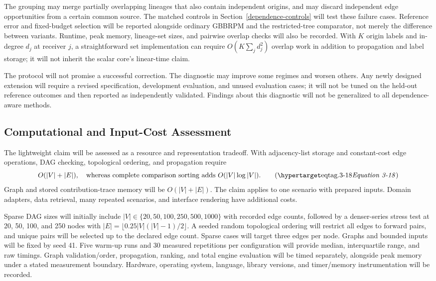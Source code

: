 The grouping may merge partially overlapping lineages that also contain
independent origins, and may discard independent edge opportunities from a
certain common source. The matched controls in Section~\ref{dependence-controls}
will test these failure cases. Reference error and fixed-budget selection will
be reported alongside ordinary GBBRPM and the restricted-tree comparator,
not merely the difference between
variants. Runtime, peak memory, lineage-set sizes, and pairwise overlap checks
will also be recorded. With $K$ origin labels and in-degree $d_j$
at receiver $j$, a straightforward set implementation can require
$O(K\sum_j d_j^2)$ overlap work in addition to propagation and label storage;
it will not inherit the scalar core's linear-time claim.

The protocol will not promise a successful correction. The diagnostic may
improve some regimes and worsen others. Any newly designed extension will
require a revised specification, development evaluation, and unused evaluation
cases; it will not be tuned on the held-out reference outcomes and then
reported as independently validated. Findings about this diagnostic will not
be generalized to all dependence-aware methods.

\subsection{Computational and Input-Cost Assessment}
\label{computational-scalability}

The lightweight claim will be assessed as a resource and representation
tradeoff. With adjacency-list storage and constant-cost edge operations,
DAG checking, topological ordering, and propagation require
\[
O(|V|+|E|),
\quad\text{whereas complete comparison sorting adds }O(|V|\log|V|).
\eqtag{3-18}
\]
Graph and stored contribution-trace memory will be $O(|V|+|E|)$.
The claim applies to one scenario with prepared inputs. Domain adapters,
data retrieval, many repeated scenarios, and interface rendering have
additional costs.

Sparse DAG sizes will initially include
$|V|\in\{20,50,100,250,500,1000\}$ with recorded edge counts, followed
by a denser-series stress test at 20, 50, 100, and 250 nodes with
$|E|=\lfloor0.25|V|(|V|-1)/2\rfloor$. A seeded random topological
ordering will restrict all edges to forward pairs, and unique pairs
will be selected up to the declared edge count. Sparse cases will target
three edges per node. Graphs and bounded inputs will be fixed by seed
41. Five warm-up runs and 30 measured repetitions per
configuration will provide median, interquartile range, and raw timings.
Graph validation/order, propagation, ranking, and total engine evaluation
will be timed separately, alongside peak memory under a stated measurement
boundary. Hardware, operating system, language, library versions, and
timer/memory instrumentation will be recorded.

